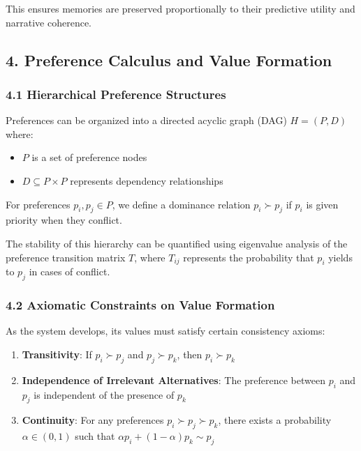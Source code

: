 \documentclass[
]{article}
\providecommand{\tightlist}{%
  \setlength{\itemsep}{0pt}\setlength{\parskip}{0pt}}
\begin{document}
This ensures memories are preserved proportionally to their predictive
utility and narrative coherence.

\subsection{4. Preference Calculus and Value
Formation}\label{preference-calculus-and-value-formation}

\subsubsection{4.1 Hierarchical Preference
Structures}\label{hierarchical-preference-structures}

Preferences can be organized into a directed acyclic graph (DAG)
\(H = (P, D)\) where:

\begin{itemize}
\tightlist
\item
  \(P\) is a set of preference nodes
\item
  \(D \subseteq P \times P\) represents dependency relationships
\end{itemize}

For preferences \(p_i, p_j \in P\), we define a dominance relation
\(p_i \succ p_j\) if \(p_i\) is given priority when they conflict.

The stability of this hierarchy can be quantified using eigenvalue
analysis of the preference transition matrix \(T\), where \(T_{ij}\)
represents the probability that \(p_i\) yields to \(p_j\) in cases of
conflict.

\subsubsection{4.2 Axiomatic Constraints on Value
Formation}\label{axiomatic-constraints-on-value-formation}

As the system develops, its values must satisfy certain consistency
axioms:

\begin{enumerate}
\def\labelenumi{\arabic{enumi}.}
\tightlist
\item
  \textbf{Transitivity}: If \(p_i \succ p_j\) and \(p_j \succ p_k\),
  then \(p_i \succ p_k\)
\item
  \textbf{Independence of Irrelevant Alternatives}: The preference
  between \(p_i\) and \(p_j\) is independent of the presence of \(p_k\)
\item
  \textbf{Continuity}: For any preferences \(p_i \succ p_j \succ p_k\),
  there exists a probability \(\alpha \in (0,1)\) such that
  \(\alpha p_i + (1-\alpha)p_k \sim p_j\)
\end{enumerate}
\end{document}
